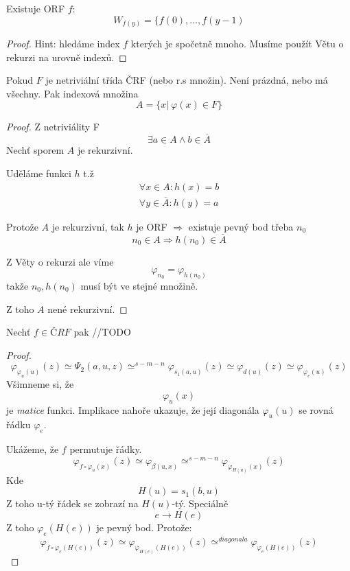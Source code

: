 \begin{theorem}[BD]
	Existuje ORF $f$:
	\[ W_{f(y)} = \{ f(0), \ldots, f(y - 1) \]
\end{theorem}
\begin{proof}
	Hint: hledáme index $f$ kterých je spočetně mnoho.
	Musíme použít Větu o rekurzi na urovně indexů.
\end{proof}

\begin{theorem}
	Pokud $F$ je netriviální třída ČRF (nebo r.s množin).
	Není prázdná, nebo má všechny.
	Pak indexová množina
	\[ A = \{ x |\ \varphi(x) \in F \} \]
\end{theorem}
\begin{proof}
	Z netriviálity F
	\[ \exists a \in A \land b \in \overline{A} \]
	Nechť sporem $A$ je rekurzivní.

	Uděláme funkci $h$ t.ž
	\begin{gather*}
		\forall x \in A: h(x) = b \\
		\forall y \in \overline{A}: h(y) = a
	\end{gather*}

	Protože $A$ je rekurzivní, tak $h$ je ORF $\Rightarrow$ existuje pevný bod třeba $n_0$
	\[ n_0 \in A \Rightarrow h(n_0) \in \overline{A} \]

	Z Věty o rekurzi ale víme
	\[ \varphi_{n_0} = \varphi_{h(n_0)} \]
	takže $n_0, h(n_0)$ musí být ve stejné množině.

	Z toho $A$ nené rekurzivní.
\end{proof}

\begin{theorem}[O rekurzi (BD)]
	Nechť $f \in ČRF$ pak
	//TODO
\end{theorem}
\begin{proof}
	\[ \varphi_{\varphi_u(u)} (z) \simeq \Psi_2(a, u, z) \simeq^{s-m-n} \varphi_{s_1(a, u)} (z) \simeq \varphi_{d(u)} (z) \simeq \varphi_{\varphi_e(u)} (z) \]
	Všimneme si, že
	\[ \varphi_u(x) \]
	je \emph{matice} funkci. Implikace nahoře ukazuje, že její diagonála $\varphi_u(u)$ se rovná řádku $\varphi_e$.

	Ukážeme, že $f$ permutuje řádky.
	\[ \varphi_{f \circ \varphi_u (x)} (z) \simeq \varphi_{\beta(u, x)} \simeq^{s-m-n} \varphi_{\varphi_{H(u)}(x)} (z) \]
	Kde
	\[ H(u) = s_1(b, u) \]
	Z toho u-tý řádek se zobrazí na $H(u)$-tý.
	Speciálně
	\[ e \to H(e) \]
	Z toho $\varphi_e(H(e))$ je pevný bod. Protože:
	\[ \varphi_{f \circ \varphi_e(H(e))} (z) \simeq \varphi_{\varphi_{H(e)}(H(e))} (z) \simeq^{diagonala} \varphi_{\varphi_e(H(e))} (z) \]
\end{proof}
